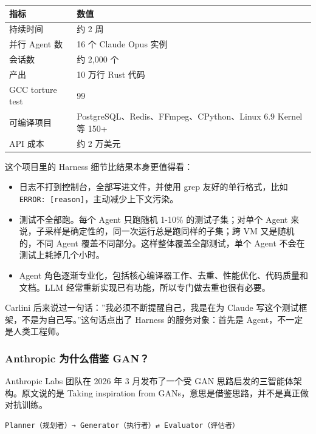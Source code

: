 \documentclass[10pt,a4paper]{ctexart}
\begin{document}
{\footnotesize
\begin{tabularx}{\textwidth}{|X|X|}
\hline
\textbf{指标} & \textbf{数值} \\
\hline
持续时间 & 约 2 周 \\
\hline
并行 Agent 数 & 16 个 Claude Opus 实例 \\
\hline
会话数 & 约 2,000 个 \\
\hline
产出 & 10 万行 Rust 代码 \\
\hline
GCC torture test & 99\\%
\hline
可编译项目 & PostgreSQL、Redis、FFmpeg、CPython、Linux 6.9 Kernel 等 150+ \\
\hline
API 成本 & 约 2 万美元 \\
\hline
\end{tabularx}
}



这个项目里的 Harness 细节比结果本身更值得看：


\begin{itemize}[itemsep=2pt, topsep=4pt]
  \item 日志不打到控制台，全部写进文件，并使用 grep 友好的单行格式，比如 \texttt{ERROR: [reason]}，主动减少上下文污染。
  \item 测试不全部跑。每个 Agent 只跑随机 1-10\% 的测试子集；对单个 Agent 来说，子采样是确定性的，同一次运行总是跑同样的子集；跨 VM 又是随机的，不同 Agent 覆盖不同部分。这样整体覆盖全部测试，单个 Agent 不会在测试上耗掉几个小时。
  \item Agent 角色逐渐专业化，包括核心编译器工作、去重、性能优化、代码质量和文档。LLM 经常重新实现已有功能，所以专门做去重也很有必要。
\end{itemize}


Carlini 后来说过一句话：”我必须不断提醒自己，我是在为 Claude 写这个测试框架，不是为自己写。”这句话点出了 Harness 的服务对象：首先是 Agent，不一定是人类工程师。



\subsubsection{Anthropic 为什么借鉴 GAN？}


Anthropic Labs 团队在 2026 年 3 月发布了一个受 GAN 思路启发的三智能体架构。原文说的是 Taking inspiration from GANs，意思是借鉴思路，并不是真正做对抗训练。



\begin{lstlisting}
Planner（规划者）→ Generator（执行者）⇄ Evaluator（评估者）
\end{lstlisting}
\end{document}
